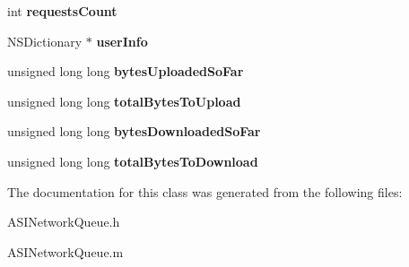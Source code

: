 \begin{DoxyCompactItemize}
\item 
\hypertarget{interface_a_s_i_network_queue_a7f329966c4e2b45cf3a27fbeab08bad2}{
int {\bfseries requestsCount}}
\label{interface_a_s_i_network_queue_a7f329966c4e2b45cf3a27fbeab08bad2}

\item 
\hypertarget{interface_a_s_i_network_queue_ae561eee119fad8abe68872654fb7990c}{
NSDictionary $\ast$ {\bfseries userInfo}}
\label{interface_a_s_i_network_queue_ae561eee119fad8abe68872654fb7990c}

\item 
\hypertarget{interface_a_s_i_network_queue_a45119a1b105861cde81c143b8691f1f9}{
unsigned long long {\bfseries bytesUploadedSoFar}}
\label{interface_a_s_i_network_queue_a45119a1b105861cde81c143b8691f1f9}

\item 
\hypertarget{interface_a_s_i_network_queue_abccc15e42d85fccec210aa32d13ad583}{
unsigned long long {\bfseries totalBytesToUpload}}
\label{interface_a_s_i_network_queue_abccc15e42d85fccec210aa32d13ad583}

\item 
\hypertarget{interface_a_s_i_network_queue_a293e644d22964c618c66eb84b5777cd4}{
unsigned long long {\bfseries bytesDownloadedSoFar}}
\label{interface_a_s_i_network_queue_a293e644d22964c618c66eb84b5777cd4}

\item 
\hypertarget{interface_a_s_i_network_queue_ae26326316e3a838650811039eb68295e}{
unsigned long long {\bfseries totalBytesToDownload}}
\label{interface_a_s_i_network_queue_ae26326316e3a838650811039eb68295e}

\end{DoxyCompactItemize}


The documentation for this class was generated from the following files:\begin{DoxyCompactItemize}
\item 
ASINetworkQueue.h\item 
ASINetworkQueue.m\end{DoxyCompactItemize}

